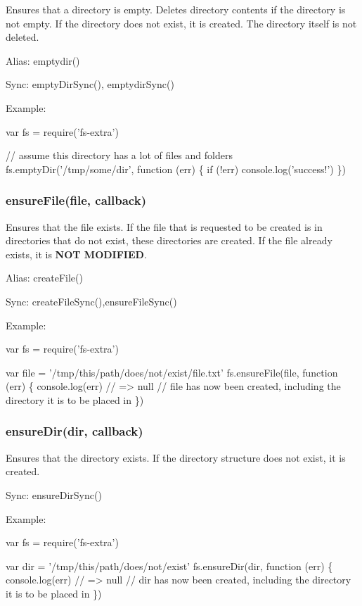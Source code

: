 Ensures that a directory is empty. Deletes directory contents if the directory is not empty. If the directory does not exist, it is created. The directory itself is not deleted.

Alias\+: {\ttfamily emptydir()}

Sync\+: {\ttfamily empty\+Dir\+Sync()}, {\ttfamily emptydir\+Sync()}

Example\+:


\begin{DoxyCode}
var fs = require('fs-extra')

// assume this directory has a lot of files and folders
fs.emptyDir('/tmp/some/dir', function (err) \{
  if (!err) console.log('success!')
\})
\end{DoxyCode}


\subsubsection*{ensure\+File(file, callback)}

Ensures that the file exists. If the file that is requested to be created is in directories that do not exist, these directories are created. If the file already exists, it is {\bfseries N\+OT M\+O\+D\+I\+F\+I\+ED}.

Alias\+: {\ttfamily create\+File()}

Sync\+: {\ttfamily create\+File\+Sync()},{\ttfamily ensure\+File\+Sync()}

Example\+:


\begin{DoxyCode}
var fs = require('fs-extra')

var file = '/tmp/this/path/does/not/exist/file.txt'
fs.ensureFile(file, function (err) \{
  console.log(err) // => null
  // file has now been created, including the directory it is to be placed in
\})
\end{DoxyCode}


\subsubsection*{ensure\+Dir(dir, callback)}

Ensures that the directory exists. If the directory structure does not exist, it is created.

Sync\+: {\ttfamily ensure\+Dir\+Sync()}

Example\+:


\begin{DoxyCode}
var fs = require('fs-extra')

var dir = '/tmp/this/path/does/not/exist'
fs.ensureDir(dir, function (err) \{
  console.log(err) // => null
  // dir has now been created, including the directory it is to be placed in
\})
\end{DoxyCode}


